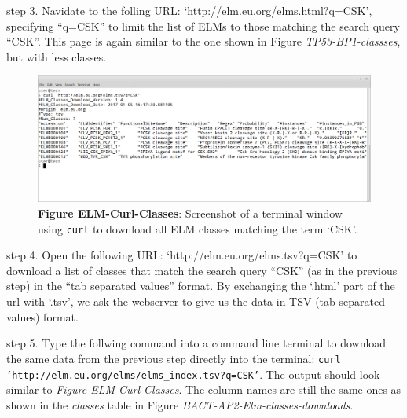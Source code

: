 step 3. Navidate to the folling URL:
`http://elm.eu.org/elms.html?q=CSK', specifying ``q=CSK'' to limit the
list of ELMs to those matching the search query ``CSK''. This page is
again similar to the one shown in Figure \emph{TP53-BP1-classses}, but
with less classes.


\begin{figure}[h!]
\centering
\includegraphics[width=\textwidth]{Figures/BACT_2/elm_curl_classes_CSK.png}
\caption{
\textbf{Figure ELM-Curl-Classes}: Screenshot of a terminal window using
\texttt{curl} to download all ELM classes matching the term `CSK'.
}
\end{figure}

step 4. Open the following URL: `http://elm.eu.org/elms.tsv?q=CSK' to
download a list of classes that match the search query ``CSK'' (as in
the previous step) in the ``tab separated values'' format. By exchanging
the `.html' part of the url with `.tsv', we ask the webserver to give us
the data in TSV (tab-separated values) format.


step 5. Type the follwing command into a command line terminal to
download the same data from the previous step directly into the
terminal: \texttt{curl 'http://elm.eu.org/elms/elms\_index.tsv?q=CSK'}.
The output should look similar to \emph{Figure ELM-Curl-Classes}. The
column names are still the same ones as shown in the \emph{classes}
table in Figure \emph{BACT-AP2-Elm-classes-downloads}.


